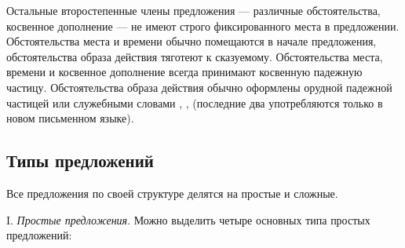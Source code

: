 Остальные второстепенные члены предложения --- различные обстоятельства, косвенное дополнение --- не имеют строго фиксированного места в предложении. Обстоятельства места и времени обычно помещаются в начале предложения, обстоятельства образа действия тяготеют к сказуемому. Обстоятельства места, времени и косвенное дополнение всегда принимают косвенную падежную частицу.
Обстоятельства образа действия обычно оформлены орудной падежной частицей или служебными словами , ,  (последние два употребляются только в новом письменном языке).

\subsection{Типы предложений}

Все предложения по своей структуре делятся на простые и сложные.

I. \emph{Простые предложения}. Можно выделить четыре основных типа простых предложений:

